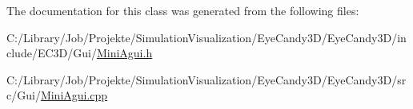 The documentation for this class was generated from the following files\+:\begin{DoxyCompactItemize}
\item 
C\+:/\+Library/\+Job/\+Projekte/\+Simulation\+Visualization/\+Eye\+Candy3\+D/\+Eye\+Candy3\+D/include/\+E\+C3\+D/\+Gui/\mbox{\hyperlink{_mini_agui_8h}{Mini\+Agui.\+h}}\item 
C\+:/\+Library/\+Job/\+Projekte/\+Simulation\+Visualization/\+Eye\+Candy3\+D/\+Eye\+Candy3\+D/src/\+Gui/\mbox{\hyperlink{_mini_agui_8cpp}{Mini\+Agui.\+cpp}}\end{DoxyCompactItemize}
